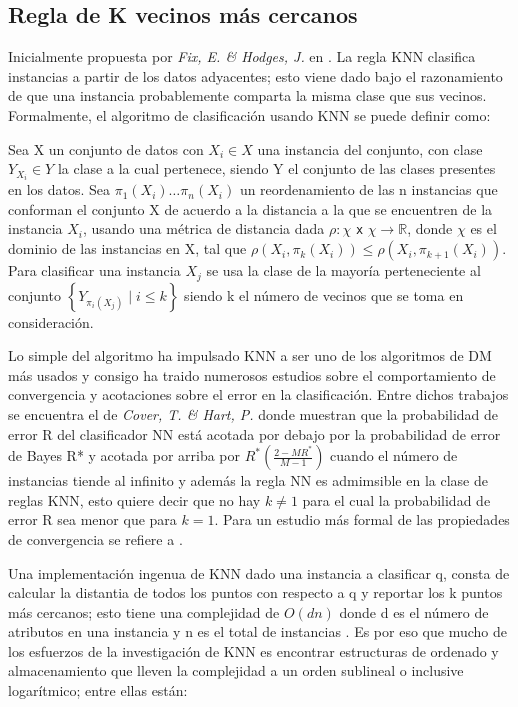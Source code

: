 \subsection{Regla de K vecinos más cercanos}

Inicialmente propuesta por \emph{Fix, E. \& Hodges, J.} en \cite{fix1951discriminatory}. La regla KNN clasifica instancias a partir de los datos adyacentes; esto viene dado bajo el razonamiento de que una instancia probablemente comparta la misma clase que sus vecinos. Formalmente, el algoritmo de clasificación usando KNN se puede definir como:\\  

\begin{definicion}
Sea X un conjunto de datos con $X_i\in X$ una instancia del conjunto, con clase $Y_{X_i}\in Y$ la clase a la cual pertenece, siendo Y el conjunto de las clases presentes en los datos. Sea $\pi_1(X_i)\dots \pi_n(X_i)$ un reordenamiento de las n instancias que conforman el conjunto X de acuerdo a la distancia a la que se encuentren de la instancia $X_i$, usando una métrica de distancia dada $\rho:\chi$ \texttt{x} $\chi \rightarrow \mathbb{R}$, donde $\chi$ es el dominio de las instancias en X, tal que $\rho(X_i,\pi_k(X_i)) \leq \rho(X_i,\pi_{k+1}(X_i))$. Para clasificar una instancia $X_j$ se usa la clase de la mayoría perteneciente al conjunto $\left\{Y_{\pi_i(X_j)} \mid i \leq k\right\}$ siendo k el número de vecinos que se toma en consideración. \cite{shalev2014understanding}
\end{definicion}

Lo simple del algoritmo ha impulsado KNN a ser uno de los algoritmos de DM más usados y consigo ha traido numerosos estudios sobre el comportamiento de convergencia y acotaciones sobre el error en la clasificación. Entre dichos trabajos se encuentra el de \emph{Cover, T. \& Hart, P.} \cite{cover1967nearest} donde muestran que la probabilidad de error R del clasificador NN está acotada por debajo por la probabilidad de error de Bayes R* y acotada por arriba por $R^*(\frac{2-MR^*}{M-1})$ cuando el número de instancias tiende al infinito y además la regla NN es admimsible en la clase de reglas KNN, esto quiere decir que no hay $k\neq 1$ para el cual la probabilidad de error R sea menor que para $k=1$. Para un estudio más formal de las propiedades de convergencia se refiere a \cite{devroye2013probabilistic}.

Una implementación ingenua de KNN dado una instancia a clasificar q, consta de calcular la distantia de todos los puntos con respecto a q y reportar los k puntos más cercanos; esto tiene una complejidad de $O(dn)$ donde d es el número de atributos en una instancia y n es el total de instancias \cite{shakhnarovich2006nearest}. Es por eso que mucho de los esfuerzos de la investigación de KNN es encontrar estructuras de ordenado y almacenamiento que lleven la complejidad a un orden sublineal o inclusive logarítmico; entre ellas están:

